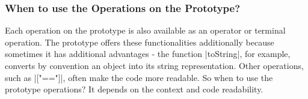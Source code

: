 \subsubsection{When to use the Operations on the Prototype?} %
\label{subsub:When to use the operations on the prototype?}
Each operation on the prototype is also available as an operator or terminal
operation. The prototype offers these functionalities additionally because
sometimes it has additional advantages - the function |toString|, for example,
converts by convention an object into its string representation. Other
operations, such as |["=="]|, often make the code more readable. So when to use
the prototype operations? It depends on the context and code readability.


